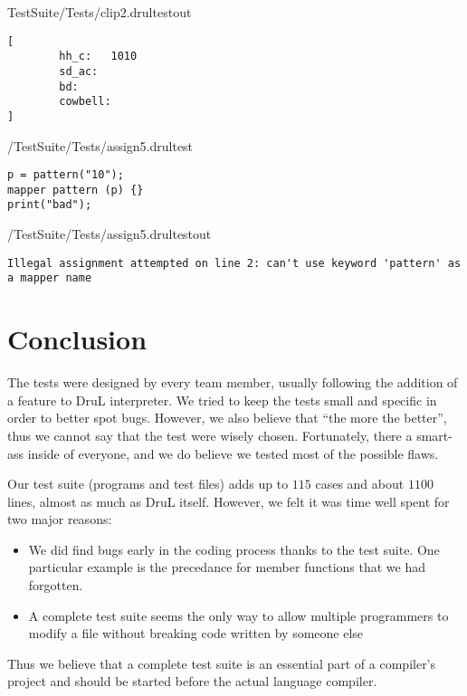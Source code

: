 TestSuite/Tests/clip2.drultestout

\begin{lstlisting}[basicstyle=\color{blue}\small]
[
        hh_c:   1010
        sd_ac:
        bd:
        cowbell:
]
\end{lstlisting}




/TestSuite/Tests/assign5.drultest
\begin{lstlisting}[basicstyle=\color{red}\small]
p = pattern("10");
mapper pattern (p) {}
print("bad");
\end{lstlisting}

/TestSuite/Tests/assign5.drultestout
\begin{lstlisting}[basicstyle=\color{blue}\small]
Illegal assignment attempted on line 2: can't use keyword 'pattern' as a mapper name
\end{lstlisting}




\section{Conclusion}
The tests were designed by every team member, usually following the addition
of a feature to DruL interpreter. We tried to keep the tests small and specific
in order to better spot bugs. However, we also believe that ``the more the
better'', thus we cannot say that the test were wisely chosen. Fortunately,
there a smart-ass inside of everyone, and we do believe we tested most of
the possible flaws.

Our test suite (programs and test files) adds up to $115$ cases and 
about $1100$ lines, almost
as much as DruL itself. However, we felt it was time well spent for two major
reasons:
\begin{itemize}
\item We did find bugs early in the coding process thanks to the test suite. One
particular example is the precedance for member functions that we had forgotten.
\item A complete test suite seems the only way to allow multiple programmers to
modify a file without breaking code written by someone else
\end{itemize}
Thus we believe that a complete test suite is an essential part of a compiler's
project and should be started before the actual language compiler.


